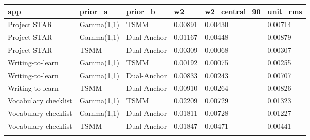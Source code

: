 \begin{longtable}{llllll}
\toprule
app & prior\_a & prior\_b & w2 & w2\_central\_90 & unit\_rms \\
\midrule\endhead
Project STAR & Gamma(1,1) & TSMM & 0.00891 & 0.00430 & 0.00714 \\ \addlinespace[3pt]
Project STAR & Gamma(1,1) & Dual-Anchor & 0.01167 & 0.00448 & 0.00879 \\ \addlinespace[3pt]
Project STAR & TSMM & Dual-Anchor & 0.00309 & 0.00068 & 0.00307 \\ \addlinespace[3pt]
Writing-to-learn & Gamma(1,1) & TSMM & 0.00192 & 0.00075 & 0.00255 \\ \addlinespace[3pt]
Writing-to-learn & Gamma(1,1) & Dual-Anchor & 0.00833 & 0.00243 & 0.00707 \\ \addlinespace[3pt]
Writing-to-learn & TSMM & Dual-Anchor & 0.00910 & 0.00264 & 0.00826 \\ \addlinespace[3pt]
Vocabulary checklist & Gamma(1,1) & TSMM & 0.02209 & 0.00729 & 0.01323 \\ \addlinespace[3pt]
Vocabulary checklist & Gamma(1,1) & Dual-Anchor & 0.01811 & 0.00728 & 0.01227 \\ \addlinespace[3pt]
Vocabulary checklist & TSMM & Dual-Anchor & 0.01847 & 0.00471 & 0.00441 \\ \addlinespace[3pt]
\bottomrule\end{longtable}
